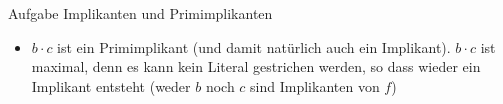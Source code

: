 \begin{frame}[allowframebreaks]{Aufgabe \thesection}{Implikanten und Primimplikanten}
\begin{solution}
\begin{itemize}
      \end{itemize}
  \end{solution}
  \begin{solution}
      \begin{itemize}
          \item $b\cdot c$ ist ein Primimplikant (und damit natürlich auch ein Implikant). $b\cdot c$ ist maximal, denn es kann kein Literal gestrichen werden, so dass wieder ein Implikant entsteht (weder $b$ noch $c$ sind Implikanten von $f$)
      \end{itemize}
  \end{solution}
\end{frame}
